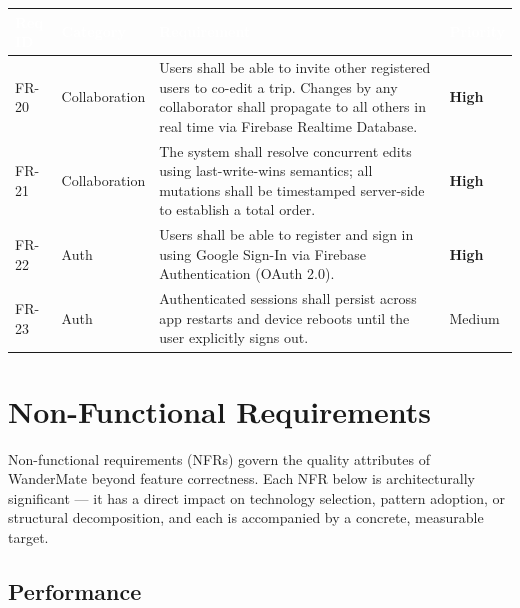 \documentclass[12pt, a4paper]{article}
\newcommand{\reqid}[1]{\textsc{\small #1}}
\newcommand{\high}{\textbf{High}}
\newcommand{\medium}{Medium}
\newcommand{\thcell}[1]{\textcolor{white}{\textbf{\small #1}}}
\begin{document}
\vspace{0.4em}
\begin{longtable}{C{1.6cm} C{2.0cm} L{8.2cm} C{1.8cm}}
\toprule
{}
\thcell{Req ID} & \thcell{Category} & \thcell{Requirement} & \thcell{Priority} \\
\midrule
\endhead
\bottomrule
\endfoot

\reqid{FR-20} & Collaboration &
Users shall be able to invite other registered users to co-edit a trip. Changes by any collaborator shall propagate to all others in real time via Firebase Realtime Database. &
\high \\

\reqid{FR-21} & Collaboration &
The system shall resolve concurrent edits using last-write-wins semantics; all mutations shall be timestamped server-side to establish a total order. &
\high \\

\reqid{FR-22} & Auth &
Users shall be able to register and sign in using Google Sign-In via Firebase Authentication (OAuth 2.0). &
\high \\

\reqid{FR-23} & Auth &
Authenticated sessions shall persist across app restarts and device reboots until the user explicitly signs out. &
\medium \\

\end{longtable}

\section{Non-Functional Requirements}

Non-functional requirements (NFRs) govern the quality attributes of WanderMate beyond feature correctness. Each NFR below is architecturally significant --- it has a direct impact on technology selection, pattern adoption, or structural decomposition, and each is accompanied by a concrete, measurable target.

\subsection{Performance}
\end{document}
